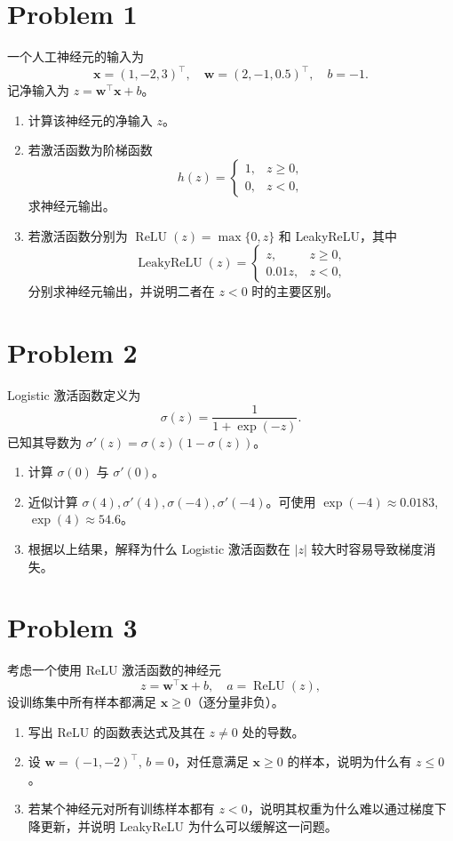 \section*{Problem 1}

一个人工神经元的输入为
\[
\bm{x} = (1, -2, 3)^\top,\quad
\bm{w} = (2, -1, 0.5)^\top,\quad
b = -1.
\]
记净输入为 $z = \bm{w}^\top \bm{x} + b$。
\begin{enumerate}
    \item 计算该神经元的净输入 $z$。
    \item 若激活函数为阶梯函数
    \[
    h(z) = \begin{cases}
        1, & z \ge 0,\\
        0, & z < 0,
    \end{cases}
    \]
    求神经元输出。
    \item 若激活函数分别为 $\operatorname{ReLU}(z) = \max\{0, z\}$ 和 LeakyReLU，其中
    \[
    \operatorname{LeakyReLU}(z) = \begin{cases}
        z,      & z \ge 0,\\
        0.01z,  & z < 0,
    \end{cases}
    \]
    分别求神经元输出，并说明二者在 $z < 0$ 时的主要区别。
\end{enumerate}

\section*{Problem 2}

Logistic 激活函数定义为
\[
\sigma(z) = \frac{1}{1 + \exp(-z)}.
\]
已知其导数为 $\sigma'(z) = \sigma(z)(1 - \sigma(z))$。
\begin{enumerate}
    \item 计算 $\sigma(0)$ 与 $\sigma'(0)$。
    \item 近似计算 $\sigma(4), \sigma'(4), \sigma(-4), \sigma'(-4)$。可使用 $\exp(-4) \approx 0.0183$, $\exp(4) \approx 54.6$。
    \item 根据以上结果，解释为什么 Logistic 激活函数在 $|z|$ 较大时容易导致梯度消失。
\end{enumerate}

\section*{Problem 3}

考虑一个使用 ReLU 激活函数的神经元
\[
z = \bm{w}^\top \bm{x} + b,\quad a = \operatorname{ReLU}(z),
\]
设训练集中所有样本都满足 $\bm{x} \ge 0$（逐分量非负）。
\begin{enumerate}
    \item 写出 ReLU 的函数表达式及其在 $z \neq 0$ 处的导数。
    \item 设 $\bm{w} = (-1, -2)^\top$, $b = 0$，对任意满足 $\bm{x} \ge 0$ 的样本，说明为什么有 $z \le 0$。
    \item 若某个神经元对所有训练样本都有 $z < 0$，说明其权重为什么难以通过梯度下降更新，并说明 LeakyReLU 为什么可以缓解这一问题。
\end{enumerate}
